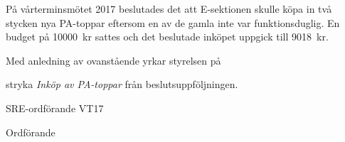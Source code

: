 \documentclass[../_main/handlingar.tex]{subfiles}
\begin{document}

På vårterminsmötet 2017 beslutades det att E-sektionen skulle köpa in två stycken nya PA-toppar eftersom en av de gamla inte var funktionsduglig. En budget på \SI{10000}{kr} sattes och det beslutade inköpet uppgick till \SI{9018}{kr}.

Med anledning av ovanstående yrkar styrelsen på

\begin{attsatser}
    \att stryka \emph{Inköp av PA-toppar} från beslutsuppföljningen.
\end{attsatser}

\begin{signatures}{2}
    \mvh
	\signature{Pontus Landgren}{SRE-ordförande VT17}
    \signature{\ordf}{Ordförande}

\end{signatures}
\end{document}
